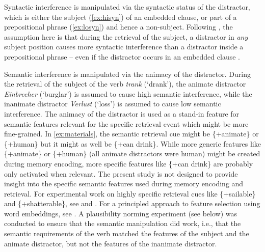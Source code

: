 \documentclass[review,preprint,12pt,authoryear,floatsintext]{elsarticle}
\begin{document}
Syntactic interference is manipulated via the syntactic status of the distractor, which is either the subject (\ref{ex:hisyn}) of an embedded clause, or part of a prepositional phrase (\ref{ex:losyn}) and hence a non-subject. {Following \cite{vandyke07}, the assumption here is that  during the retrieval of the subject, a distractor in \emph{any} subject position causes more syntactic interference than a distractor inside a prepositional phrase -- even if the distractor occurs in an embedded clause {\citep[this assumption stands in contrast to findings on so-called agreement attraction, where syntactic hierarchy plays a crucial role, see e.g.,][]{franck2002subject, franck2006agreement,franck2011_commentary, franck2020hierarchical}.}}\label{franck_refs}

Semantic interference is manipulated via the animacy of the distractor. During the retrieval of the subject of the verb \textit{trank} (`drank'), the animate distractor  \textit{Einbrecher} (`burglar') is assumed to cause high semantic interference, while the inanimate distractor \textit{Verlust} (`loss') is assumed to cause low semantic interference. {The animacy of the distractor is used as a stand-in feature for semantic features relevant for the specific retrieval event which might be more fine-grained. In \ref{ex:materials}, the semantic retrieval cue might be \{+animate\} or \{+human\} but it might as well be \{+can drink\}. While more generic features like \{+animate\} or \{+human\} (all animate distractors were human) might be created during memory encoding, more specific features like \{+can drink\} are probably only activated when relevant. The present study is not designed to provide insight into the specific semantic features used during memory encoding and retrieval. For experimental work on highly specific retrieval cues like \{+sailable\} and \{+shatterable\}, see \cite{vandyke_mcelree06} and \cite{cunnings_sturt_2018retrieval}. For a principled approach to feature selection using word embeddings, see \cite{smith2020principled}. A plausibility norming experiment (see below) was conducted to ensure that the semantic manipulation did work, i.e., that the semantic requirements of the verb matched the features of the subject and the animate distractor, but not the features of the inanimate distractor.
}\label{semantic_features_encoding}
\end{document}
